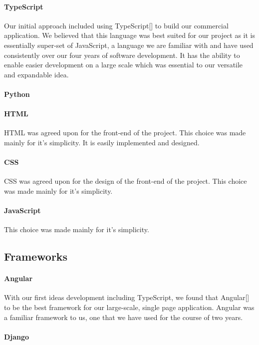 \paragraph{TypeScript}
Our initial approach included using TypeScript[] to build our commercial application. We believed that this language was best suited for our project as it is essentially super-set of JavaScript, a language we are familiar with and have used consistently over our four years of software development. It has the ability to enable easier development on a large scale which was essential to our versatile and expandable idea\cite{bierman_abadi_torgersen_2014}.

\paragraph{Python}


\paragraph{HTML}
HTML was agreed upon for the front-end of the project. This choice was made mainly for it's simplicity. It is easily implemented and designed.

\paragraph{CSS}
CSS was agreed upon for the design of the front-end of the project. This choice was made mainly for it's simplicity. 

\paragraph{JavaScript}
This choice was made mainly for it's simplicity.

\subsection{Frameworks}
\paragraph{Angular}
With our first ideas development including TypeScript, we found that Angular[] to be the best framework for our large-scale, single page application. Angular was a familiar framework to us, one that we have used for the course of two years.  

\paragraph{Django}


